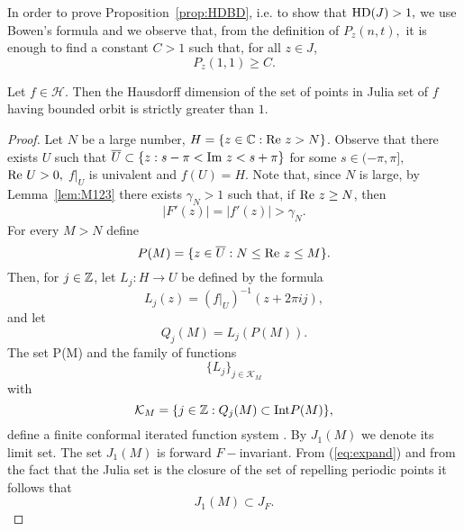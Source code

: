 In order to prove Proposition~\ref{prop:HDBD}, i.e. to show that ${\mathrm{HD}}(J)
>1,$ we use Bowen's formula and we observe that, from the definition of
$P_z(n,t),$ it is enough to find a constant $C>1$ such that, for all $z\in
J$,
\begin{equation}
  \label{eq:P_t}
  P_z(1,1)\geq C.
\end{equation}

\begin{proposition}\label{prop:HDBD}
  Let $f \in \mathcal{H}$. Then the Hausdorff dimension of the set of points
  in Julia set of $f$ having bounded orbit is strictly greater than $1$.
\end{proposition}

\begin{proof}
  Let $N$ be a large number, $H =\{z\in{\mathbb C}: \textrm{Re } z>N\}$. Observe that there
  exists $U$ such that $\overline{U}\subset \{z: s-\pi <\textrm{Im } z < s+{\pi} \}$
  for some $s\in(-\pi,\pi],$ $\textrm{Re } U>0,$ $f|_U$ is univalent and $f(U)=H$.
  Note that, since $N$ is large, by Lemma~\ref{lem:M123} there exists
  $\gamma_N>1$ such that, if $\textrm{Re } z\geq N$, then
  \begin{equation}
    \label{eq:expand}
    |F'(z)|=|f'(z)|>\gamma_N.
  \end{equation}
  For every $M>N$ define
  \[
  P(M) =\{z\in \overline{U}:N\leq\textrm{Re } z\leq M\}.
  \]
  Then, for $j\in{\mathbb Z}$, let $L_j:H\rightarrow U$ be defined by the
  formula
  \[
  L_j(z)=(f|_U)^{-1}(z+2\pi i j),
  \]
  and let
  \begin{equation}\label{subs:J1}
  Q_j(M)=L_j(P(M)).
  \end{equation}
  The set P(M) and the family of functions
  \[
  \{L_j\}_{j\in \mathcal{K}_M}
  \]
  with
  \[
  \mathcal{K}_M=\{j\in{\mathbb Z}:Q_j(M)\subset \text{{\rm Int}} P(M)\},
  \]
  define a finite conformal iterated function system .  By $J_1(M)$ we
  denote its limit set.  The set $J_1(M)$ is forward $F-$invariant.  From
  (\ref{eq:expand}) and from the fact that the Julia set is the closure of
  the set of repelling periodic points it follows that
  \begin{equation} \label{eq:J1NJFa}
  J_1(M)\subset J_{F}.
  \end{equation}
  

\end{proof}
